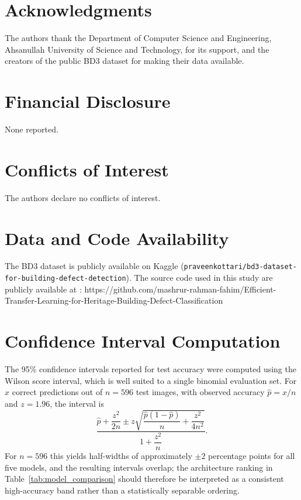 \documentclass[ASNA, twocolumn]{USG}
\begin{document}
\section*{Acknowledgments}
The authors thank the Department of Computer Science and Engineering, Ahsanullah University of Science and Technology, for its support, and the creators of the public BD3 dataset for making their data available.

\section*{Financial Disclosure}
None reported.

\section*{Conflicts of Interest}
The authors declare no conflicts of interest.

\section*{Data and Code Availability}
The BD3 dataset is publicly available on Kaggle (\texttt{praveenkottari/bd3-dataset-for-building-defect-detection}). The source code used in this study are publicly available at : https://github.com/mashrur-rahman-fahim/Efficient-Transfer-Learning-for-Heritage-Building-Defect-Classification



\appendix

\section{Confidence Interval Computation}
\label{app:ci}
The 95\% confidence intervals reported for test accuracy were computed using the Wilson score interval, which is well suited to a single binomial evaluation set. For $x$ correct predictions out of $n=596$ test images, with observed accuracy $\hat{p}=x/n$ and $z=1.96$, the interval is
\begin{equation}
\frac{\hat{p} + \dfrac{z^{2}}{2n} \pm z\sqrt{\dfrac{\hat{p}(1-\hat{p})}{n} + \dfrac{z^{2}}{4n^{2}}}}{1 + \dfrac{z^{2}}{n}}.
\end{equation}
For $n=596$ this yields half-widths of approximately $\pm2$ percentage points for all five models, and the resulting intervals overlap; the architecture ranking in Table~\ref{tab:model_comparison} should therefore be interpreted as a consistent high-accuracy band rather than a statistically separable ordering.
\end{document}
